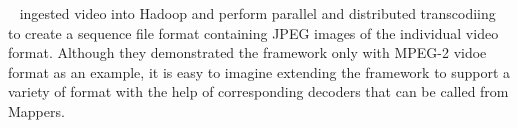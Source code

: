 \citeauthor{2013_Pivotal}~\cite{2013_Pivotal} ingested video into Hadoop and
perform parallel and distributed transcodiing to create a sequence file format
containing JPEG images of the individual video format. Although they
demonstrated the framework only with MPEG-2 vidoe format as an example, it is
easy to imagine extending the framework to support a variety of format with the
help of corresponding decoders that can be called from Mappers. 

 